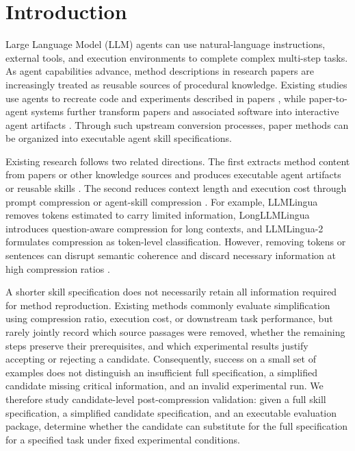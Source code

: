 \section{Introduction}

Large Language Model (LLM) agents can use natural-language instructions, external tools, and execution environments to complete complex multi-step tasks. As agent capabilities advance, method descriptions in research papers are increasingly treated as reusable sources of procedural knowledge. Existing studies use agents to recreate code and experiments described in papers \cite{starace2025paperbench,zhao2025autoreproduce}, while paper-to-agent systems further transform papers and associated software into interactive agent artifacts \cite{miao2025paper2agent}. Through such upstream conversion processes, paper methods can be organized into executable agent skill specifications.

Existing research follows two related directions. The first extracts method content from papers or other knowledge sources and produces executable agent artifacts or reusable skills \cite{miao2025paper2agent,shen2026skillfoundry,pan2026anything2skill}. The second reduces context length and execution cost through prompt compression or agent-skill compression \cite{jiang2023llmlingua,jiang2024longllmlingua,pan2024llmlingua2,gao2026skillreducer}. For example, LLMLingua removes tokens estimated to carry limited information, LongLLMLingua introduces question-aware compression for long contexts, and LLMLingua-2 formulates compression as token-level classification. However, removing tokens or sentences can disrupt semantic coherence and discard necessary information at high compression ratios \cite{pan2024llmlingua2,liskavets2025contextcompression}.

A shorter skill specification does not necessarily retain all information required for method reproduction. Existing methods commonly evaluate simplification using compression ratio, execution cost, or downstream task performance, but rarely jointly record which source passages were removed, whether the remaining steps preserve their prerequisites, and which experimental results justify accepting or rejecting a candidate. Consequently, success on a small set of examples does not distinguish an insufficient full specification, a simplified candidate missing critical information, and an invalid experimental run. We therefore study candidate-level post-compression validation: given a full skill specification, a simplified candidate specification, and an executable evaluation package, determine whether the candidate can substitute for the full specification for a specified task under fixed experimental conditions.

